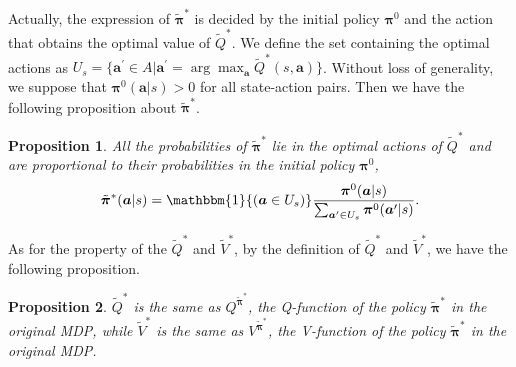 \documentclass{article}
\newtheorem{proposition}{Proposition}
\begin{document}
Actually, the expression of $\tilde{\bm{\pi}}^{*}$ is decided by the initial policy $\bm{\pi}^0$ and the action that obtains the optimal value of $\tilde{Q}^{*}$. We define the set containing the optimal actions as $U_s = \{\bm{a}^\prime \in A | \bm{a}^\prime = \arg\max_{\bm{a} } \tilde{Q}^{*}(s,\bm{a} )\}$. Without loss of generality, we suppose that $\bm{\pi}^0(\bm{a}|s)>0$ for all state-action pairs. Then we have the following proposition about $\tilde{\bm{\pi}}^{*}$.
\begin{proposition} \label{converged_policy}
All the probabilities of $\tilde{\bm{\pi}}^{*}$ lie in the optimal actions of $\tilde{Q}^{*}$ and are proportional to their probabilities in the initial policy $\bm{\pi}^0$,
        $$\tilde{\bm{\pi}}^{*}(\bm{a}|s) = \mathbbm{1}{(\bm{a} \in U_s)} \frac{\bm{\pi}^0(\bm{a}|s)}{\sum_{\bm{a}^\prime \in U_s}\bm{\pi}^0(\bm{a}^\prime|s)}.$$
\end{proposition}
As for the property of the $\tilde{Q}^{*}$ and $\tilde{V}^{*}$,  by the definition of $\tilde{Q}^{*}$ and $\tilde{V}^{*}$, we have the following proposition. 
\begin{proposition} \label{converged_Q}
$\tilde{Q}^*$ is the same as $Q^{\tilde{\bm{\pi}}^*}$, the Q-function of the policy $\tilde{\bm{\pi}}^{*}$ in the original MDP, while $\tilde{V}^*$ is the same as $V^{\tilde{\bm{\pi}}^* }$, the V-function of the policy $\tilde{\bm{\pi}}^{*}$ in the original MDP.

\end{proposition}
\end{document}
